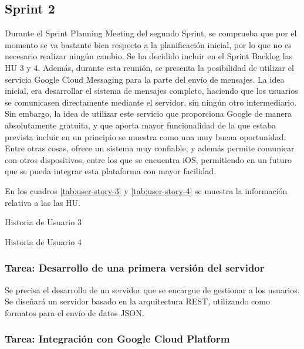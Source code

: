 \subsection{Sprint 2}

Durante el Sprint Planning Meeting del segundo Sprint, se comprueba que por el momento se va bastante bien respecto a la planificación inicial, por lo que no es necesario realizar ningún cambio. Se ha decidido incluir en el Sprint Backlog las \ac{HU} 3 y 4. Además, durante esta reunión, se presenta la posibilidad de utilizar el servicio Google Cloud Messaging para la parte del envío de mensajes. La idea inicial, era desarrollar el sistema de mensajes completo, haciendo que los usuarios se comunicasen directamente mediante el servidor, sin ningún otro intermediario. Sin embargo, la idea de utilizar este servicio que proporciona Google de manera absolutamente gratuita, y que aporta mayor funcionalidad de la que estaba prevista incluir en un principio se muestra como una muy buena oportunidad. Entre otras cosas, ofrece un sistema muy confiable, y además permite comunicar con otros dispositivos, entre los que se encuentra iOS, permitiendo en un futuro que se pueda integrar esta plataforma con mayor facilidad.

En los cuadros \ref{tab:user-story-3} y \ref{tab:user-story-4} se muestra la información relativa a las las \ac{HU}.

\begin{table}[hp]
  \centering
  {\small
  
  }
  \caption{Historia de Usuario 3}
  \label{tab:user-story-3}
\end{table}

\begin{table}[hp]
  \centering
  {\small
  
  }
  \caption{Historia de Usuario 4}
  \label{tab:user-story-4}
\end{table}


\subsubsection{Tarea: Desarrollo de una primera versión del servidor}

Se precisa el desarrollo de un servidor que se encargue de gestionar a los usuarios. Se diseñará un servidor basado en la arquitectura REST, utilizando como formatos para el envío de datos JSON.


\subsubsection{Tarea: Integración con Google Cloud Platform}

